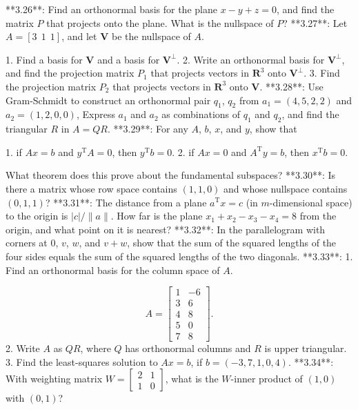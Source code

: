

**3.26**: Find an orthonormal basis for the plane \(x-y+z=0\), and find the matrix \(P\) that projects onto the plane. What is the nullspace of \(P\)?
**3.27**: Let \(A=[3\ \ 1\ \ 1]\), and let \(\mathbf{V}\) be the nullspace of \(A\).

1. Find a basis for \(\mathbf{V}\) and a basis for \(\mathbf{V}^{\perp}\).
2. Write an orthonormal basis for \(\mathbf{V}^{\perp}\), and find the projection matrix \(P_{1}\) that projects vectors in \(\mathbf{R}^{3}\) onto \(\mathbf{V}^{\perp}\).
3. Find the projection matrix \(P_{2}\) that projects vectors in \(\mathbf{R}^{3}\) onto \(\mathbf{V}\).
**3.28**: Use Gram-Schmidt to construct an orthonormal pair \(q_{1}\), \(q_{2}\) from \(a_{1}=(4,5,2,2)\) and \(a_{2}=(1,2,0,0)\), Express \(a_{1}\) and \(a_{2}\) as combinations of \(q_{1}\) and \(q_{2}\), and find the triangular \(R\) in \(A=QR\).
**3.29**: For any \(A\), \(b\), \(x\), and \(y\), show that

1. if \(Ax=b\) and \(y^{\mathrm{T}}A=0\), then \(y^{\mathrm{T}}b=0\).
2. if \(Ax=0\) and \(A^{\mathrm{T}}y=b\), then \(x^{\mathrm{T}}b=0\).

What theorem does this prove about the fundamental subspaces?
**3.30**: Is there a matrix whose row space contains \((1,1,0)\) and whose nullspace contains \((0,1,1)\)?
**3.31**: The distance from a plane \(a^{\mathrm{T}}x=c\) (in \(m\)-dimensional space) to the origin is \(|c|/\|a\|\). How far is the plane \(x_{1}+x_{2}-x_{3}-x_{4}=8\) from the origin, and what point on it is nearest?
**3.32**: In the parallelogram with corners at 0, \(v\), \(w\), and \(v+w\), show that the sum of the squared lengths of the four sides equals the sum of the squared lengths of the two diagonals.
**3.33**: 1. Find an orthonormal basis for the column space of \(A\).

\[A=\begin{bmatrix}1&-6\\ 3&6\\ 4&8\\ 5&0\\ 7&8\end{bmatrix}.\]
2. Write \(A\) as \(QR\), where \(Q\) has orthonormal columns and \(R\) is upper triangular.
3. Find the least-squares solution to \(Ax=b\), if \(b=(-3,7,1,0,4)\).
**3.34**: With weighting matrix \(W=\begin{bmatrix}2&1\\ 1&0\end{bmatrix}\), what is the \(W\)-inner product of \((1,0)\) with \((0,1)\)?